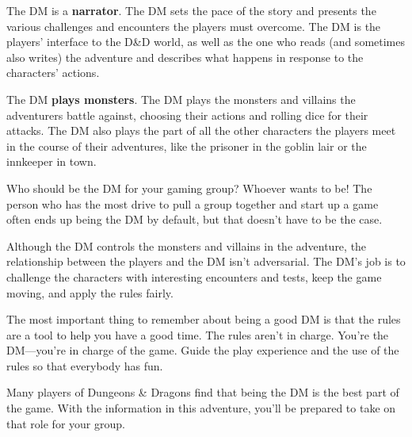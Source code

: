 \documentclass[10pt,a4paper,twoside,bg=print,twocolumn,openany,nodeprecatedcode]{dndbook}
\begin{document}
The DM is a \textbf{narrator}. The DM sets the pace of the story and presents the various challenges and encounters the players must overcome. The DM is the players' interface to the D\&D world, as well as the one who reads (and sometimes also writes) the adventure and describes what happens in response to the characters' actions.

The DM \textbf{plays monsters}. The DM plays the monsters and villains the adventurers battle against, choosing their actions and rolling dice for their attacks. The DM also plays the part of all the other characters the players meet in the course of their adventures, like the prisoner in the goblin lair or the innkeeper in town.

Who should be the DM for your gaming group? Whoever wants to be! The person who has the most drive to pull a group together and start up a game often ends up being the DM by default, but that doesn't have to be the case.

Although the DM controls the monsters and villains in the adventure, the relationship between the players and the DM isn't adversarial. The DM's job is to challenge the characters with interesting encounters and tests, keep the game moving, and apply the rules fairly.

The most important thing to remember about being a good DM is that the rules are a tool to help you have a good time. The rules aren't in charge. You're the DM—you're in charge of the game. Guide the play experience and the use of the rules so that everybody has fun.

Many players of Dungeons \& Dragons find that being the DM is the best part of the game. With the information in this adventure, you'll be prepared to take on that role for your group.
\end{document}
